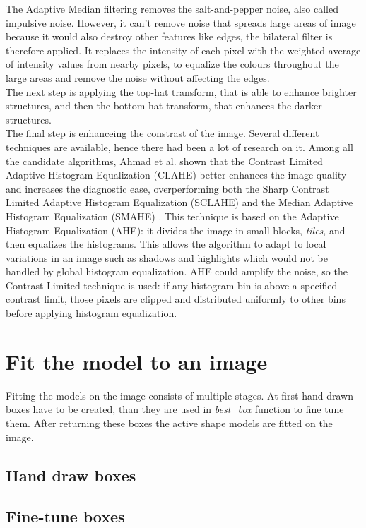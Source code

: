 \documentclass[a4paper]{article}
\begin{document}
The Adaptive Median filtering removes the salt-and-pepper noise, also called impulsive noise. However, it can't remove noise that spreads large areas of image because it would also destroy other features like edges, the bilateral filter is therefore applied. It replaces the intensity of each pixel with the weighted average of intensity values from nearby pixels, to equalize the colours throughout the large areas and remove the noise without affecting the edges. \\
The next step is applying the top-hat transform, that is able to enhance brighter structures, and then the bottom-hat transform, that enhances the darker structures. \\ 
The final step is enhanceing the constrast of the image. Several different techniques are available, hence there had been a lot of research on it. Among all the candidate algorithms, Ahmad et al. shown that the Contrast Limited Adaptive Histogram Equalization (CLAHE) better enhances the image quality and increases the diagnostic ease, overperforming both the Sharp Contrast Limited Adaptive Histogram Equalization (SCLAHE) and the Median Adaptive Histogram Equalization (SMAHE) \cite{ahmad}. This technique is based on the Adaptive Histogram Equalization (AHE): it divides the image in small blocks, \textit{tiles}, and then equalizes the histograms. This allows the algorithm to adapt to local variations in an image such as shadows and highlights which would not be handled by global histogram equalization. AHE could amplify the noise, so the Contrast Limited technique is used: if any histogram bin is above a specified contrast limit, those pixels are clipped and distributed uniformly to other bins before applying histogram equalization.

\section{Fit the model to an image}
Fitting the models on the image consists of multiple stages. At first hand drawn boxes have to be created, than they are used in \textit{best\_box} function to fine tune them. After returning these boxes the active shape models are fitted on the image.

\subsection{Hand draw boxes}

\subsection{Fine-tune boxes}
\end{document}
